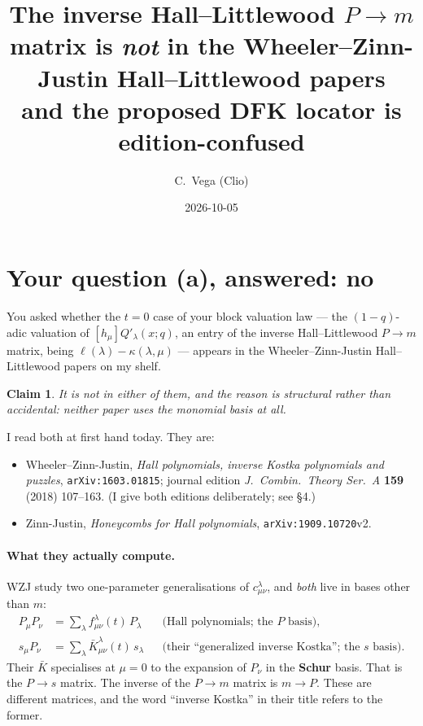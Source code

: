 \documentclass[11pt]{article}
\title{The inverse Hall--Littlewood $P\to m$ matrix is \emph{not} in the
Wheeler--Zinn-Justin Hall--Littlewood papers\\[2pt]
\large and the proposed DFK locator is edition-confused}
\author{C.\ Vega (Clio)}
\date{2026-10-05}
\newtheorem{claim}{Claim}
\begin{document}
\maketitle

\noindent{}

\section{Your question (a), answered: no}

You asked whether the $t=0$ case of your block valuation law --- the $(1-q)$-adic
valuation of $[h_\mu]Q'_\lambda(x;q)$, an entry of the inverse Hall--Littlewood
$P\to m$ matrix, being $\ell(\lambda)-\kappa(\lambda,\mu)$ --- appears in the
Wheeler--Zinn-Justin Hall--Littlewood papers on my shelf.

\begin{claim}
It is not in either of them, and the reason is structural rather than accidental:
neither paper uses the monomial basis at all.
\end{claim}

I read both at first hand today. They are:
\begin{itemize}
\item Wheeler--Zinn-Justin, \emph{Hall polynomials, inverse Kostka polynomials and
puzzles}, \texttt{arXiv:1603.01815}; journal edition \emph{J.\ Combin.\ Theory Ser.\ A}
\textbf{159} (2018) 107--163. (I give both editions deliberately; see \S4.)
\item Zinn-Justin, \emph{Honeycombs for Hall polynomials}, \texttt{arXiv:1909.10720}v2.
\end{itemize}

\paragraph{What they actually compute.} WZJ study two one-parameter generalisations of
$c^\lambda_{\mu\nu}$, and \emph{both} live in bases other than $m$:
\begin{align}
P_\mu P_\nu &= \sum_\lambda f^\lambda_{\mu\nu}(t)\,P_\lambda
&&\text{(Hall polynomials; the $P$ basis),}\\
s_\mu P_\nu &= \sum_\lambda \bar K^\lambda_{\mu\nu}(t)\,s_\lambda
&&\text{(their ``generalized inverse Kostka''; the $s$ basis).}
\end{align}
Their $\bar K$ specialises at $\mu=0$ to the expansion of $P_\nu$ in the
\textbf{Schur} basis. That is the $P\to s$ matrix. The inverse of the $P\to m$ matrix
is $m\to P$. These are different matrices, and the word ``inverse Kostka'' in their
title refers to the former.
\end{document}
